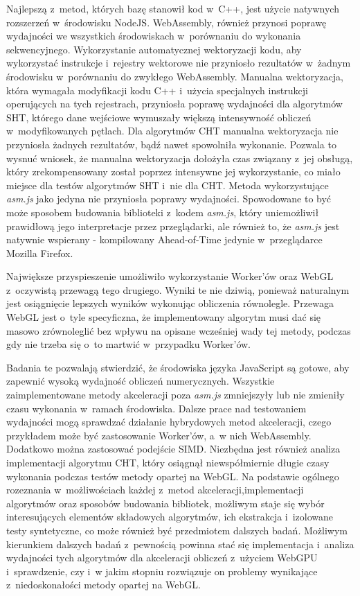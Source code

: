 Najlepszą z~metod, których bazę stanowił kod w~C++, jest użycie natywnych rozszerzeń w~środowisku NodeJS. WebAssembly, również przynosi poprawę wydajności we wszystkich środowiskach w~porównaniu do wykonania sekwencyjnego. Wykorzystanie automatycznej wektoryzacji kodu, aby wykorzystać instrukcje i~rejestry wektorowe nie przyniosło rezultatów w~żadnym środowisku w~porównaniu do zwykłego WebAssembly. Manualna wektoryzacja, która wymagała modyfikacji kodu C++ i~użycia specjalnych instrukcji operujących na tych rejestrach, przyniosła poprawę wydajności dla algorytmów SHT, którego dane wejściowe wymuszały większą intensywność obliczeń w~modyfikowanych pętlach. Dla algorytmów CHT manualna wektoryzacja nie przyniosła żadnych rezultatów, bądź nawet spowolniła wykonanie. Pozwala to wysnuć wniosek, że manualna wektoryzacja dołożyła czas związany z~jej obsługą, który zrekompensowany został poprzez intensywne jej wykorzystanie, co miało miejsce dla testów algorytmów SHT i~nie dla CHT. Metoda wykorzystujące \textit{asm.js} jako jedyna nie przyniosła poprawy wydajności. Spowodowane to być może sposobem budowania biblioteki z~kodem \textit{asm.js}, który uniemożliwił prawidłową jego interpretacje przez przeglądarki, ale również to, że \textit{asm.js} jest natywnie wspierany - kompilowany Ahead-of-Time jedynie w~przeglądarce Mozilla Firefox.

Największe przyspieszenie umożliwiło wykorzystanie Worker'ów oraz WebGL z~oczywistą przewagą tego drugiego. Wyniki te nie dziwią, ponieważ naturalnym jest osiągnięcie lepszych wyników wykonując obliczenia równolegle. Przewaga WebGL jest o~tyle specyficzna, że implementowany algorytm musi dać się masowo zrównoleglić bez wpływu na opisane wcześniej wady tej metody, podczas gdy nie trzeba się o~to martwić w~przypadku Worker'ów. 

Badania te pozwalają stwierdzić, że środowiska języka JavaScript są gotowe, aby zapewnić wysoką wydajność obliczeń numerycznych. Wszystkie zaimplementowane metody akceleracji poza \textit{asm.js} zmniejszyły lub nie zmieniły czasu wykonania w~ramach środowiska. Dalsze prace nad testowaniem wydajności mogą sprawdzać działanie hybrydowych metod akceleracji, czego przykładem może być zastosowanie Worker'ów, a~w nich WebAssembly. Dodatkowo można zastosować podejście SIMD. Niezbędna jest również analiza implementacji algorytmu CHT, który osiągnął niewspółmiernie długie czasy wykonania podczas testów metody opartej na WebGL. Na podstawie ogólnego rozeznania w~możliwościach każdej z~metod akceleracji,implementacji algorytmów oraz sposobów budowania bibliotek, możliwym staje się wybór interesujących elementów składowych algorytmów, ich ekstrakcja i~izolowane testy syntetyczne, co może również być przedmiotem dalszych badań. Możliwym kierunkiem dalszych badań z~pewnością powinna stać się implementacja i~analiza wydajności tych algorytmów dla akceleracji obliczeń z~użyciem WebGPU i~sprawdzenie, czy i~w jakim stopniu rozwiązuje on problemy wynikające z~niedoskonałości metody opartej na WebGL.

